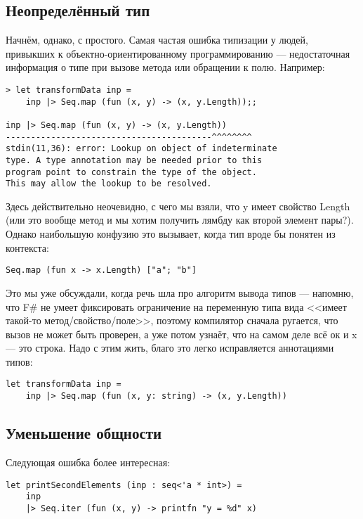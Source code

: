 \documentclass{../../text-style}
\begin{document}
\subsection{Неопределённый тип}

Начнём, однако, с простого. Самая частая ошибка типизации у людей, привыкших к объектно-ориентированному программированию --- недостаточная информация о типе при вызове метода или обращении к полю. Например:

\begin{verbatim}
> let transformData inp =
    inp |> Seq.map (fun (x, y) -> (x, y.Length));;

inp |> Seq.map (fun (x, y) -> (x, y.Length))
-----------------------------------------^^^^^^^^
stdin(11,36): error: Lookup on object of indeterminate 
type. A type annotation may be needed prior to this 
program point to constrain the type of the object. 
This may allow the lookup to be resolved.
\end{verbatim}

Здесь действительно неочевидно, с чего мы взяли, что y имеет свойство Length (или это вообще метод и мы хотим получить лямбду как второй элемент пары?). Однако наибольшую конфузию это вызывает, когда тип вроде бы понятен из контекста:

\begin{verbatim}
Seq.map (fun x -> x.Length) ["a"; "b"]
\end{verbatim}

Это мы уже обсуждали, когда речь шла про алгоритм вывода типов --- напомню, что F\# не умеет фиксировать ограничение на переменную типа вида <<имеет такой-то метод/свойство/поле>>, поэтому компилятор сначала ругается, что вызов не может быть проверен, а уже потом узнаёт, что на самом деле всё ок и x --- это строка. Надо с этим жить, благо это легко исправляется аннотациями типов:

\begin{verbatim}
let transformData inp =
    inp |> Seq.map (fun (x, y: string) -> (x, y.Length))
\end{verbatim}

\subsection{Уменьшение общности}

Следующая ошибка более интересная:

\begin{verbatim}
let printSecondElements (inp : seq<'a * int>) =
    inp
    |> Seq.iter (fun (x, y) -> printfn "y = %d" x)
\end{verbatim}
\end{document}
